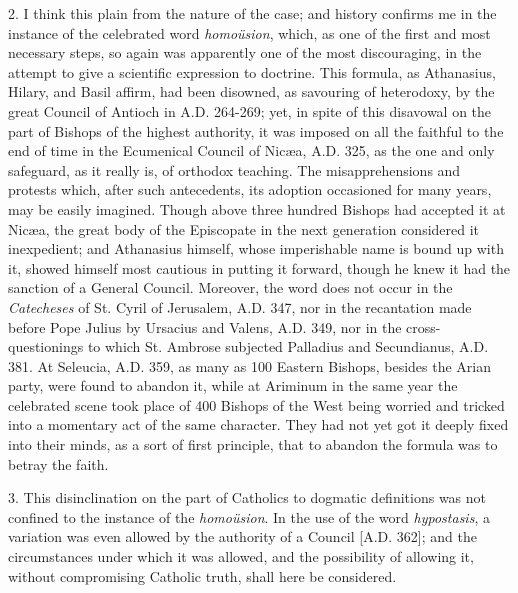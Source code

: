 2. I think this plain from the nature of the case; and history
confirms me in the instance of the celebrated word \emph{homoüsion},
which, as one of the first and most necessary steps, so again was
apparently one of the most discouraging, in the attempt to give a
scientific expression to doctrine. This formula, as Athanasius,
Hilary, and Basil affirm, had been disowned, as savouring of
heterodoxy, by the great Council of Antioch in A.D.
264-269; yet, in spite of this disavowal on the part of Bishops of the
highest authority, it was imposed on all the faithful to the end of
time in the Ecumenical Council of Nicæa, A.D.
325, as the one and only safeguard, as it really is, of orthodox
teaching. The misapprehensions and protests which, after such
antecedents, its adoption occasioned for many years, may be easily
imagined. Though above three hundred Bishops had accepted it at Nicæa,
the great body of the Episcopate in the next generation considered it
inexpedient; and Athanasius himself, whose imperishable name is bound
up with it, showed himself most cautious in putting it forward,
though he knew it had the sanction of a General Council. Moreover, the
word does not occur in the \emph{Catecheses} of St. Cyril of Jerusalem, A.D.
347, nor in the recantation made before Pope Julius by Ursacius and
Valens, A.D. 349, nor in the cross-questionings
to which St. Ambrose subjected Palladius and Secundianus, A.D.
381. At Seleucia, A.D. 359, as many as 100
Eastern Bishops, besides the Arian party, were found to abandon it,
while at Ariminum in the same year the celebrated scene took place of
400 Bishops of the West being worried and tricked into a momentary act
of the same character. They had not yet got it deeply fixed into their
minds, as a sort of first principle, that to abandon the formula was
to betray the faith.

3. This disinclination on the part of Catholics to dogmatic
definitions was not confined to the instance of the \emph{homoüsion}.
In the use of the word \emph{hypostasis}, a variation was even allowed
by the authority of a Council [A.D. 362]; and
the circumstances under which it was allowed, and the possibility of
allowing it, without compromising Catholic truth, shall here be
considered.

